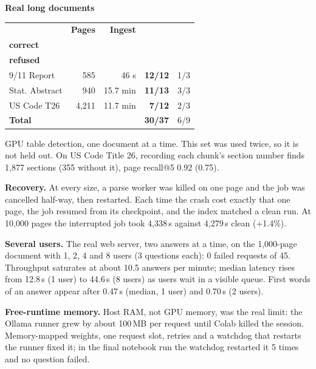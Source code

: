 \documentclass[10pt,a4paper]{article}
\newcommand{\note}[1]{{\raggedright\color{muted}\fontsize{8.3}{10}\selectfont #1\par}}
\begin{document}
\vspace{2pt}
\begin{minipage}[t]{0.52\textwidth}
\textbf{Real long documents} \par\vspace{2pt}
\renewcommand{\arraystretch}{1.18}
{\fontsize{8.2}{10}\selectfont
\begin{tabularx}{\linewidth}{@{}X r r r r@{}}
\toprule
 & \textbf{Pages} & \textbf{Ingest} & \shortstack[r]{\textbf{Answerable}\\\textbf{correct}} & \shortstack[r]{\textbf{Unanswerable}\\\textbf{refused}} \\ \midrule
9/11 Report & 585 & 46 s & \textbf{12/12} & 1/3 \\
Stat. Abstract & 940 & 15.7 min & \textbf{11/13} & 3/3 \\
US Code T26 & 4,211 & 11.7 min & \textbf{7/12} & 2/3 \\
\midrule
\textbf{Total} & & & \textbf{30/37} & 6/9 \\
\bottomrule
\end{tabularx}}
\note{GPU table detection, one document at a time. This set was used twice, so it is not held out. On US Code Title 26, recording each chunk's section number finds 1,877 sections (355 without it), page recall@5 0.92 (0.75).}
\end{minipage}\hfill
\begin{minipage}[t]{0.44\textwidth}
\fontsize{8.7}{10.6}\selectfont
\textbf{Recovery.} \enspace At every size, a parse worker was killed on one page and the job was cancelled half-way, then restarted.
Each time the crash cost exactly that one page, the job resumed from its checkpoint, and the index matched a clean run. At 10,000 pages the interrupted job took
4,338\,s against 4,279\,s clean (+1.4\%).\par\vspace{3pt}
\textbf{Several users.} \enspace The real web server, two answers at a time, on the 1,000-page document with 1, 2, 4 and 8 users (3 questions each): 0 failed requests of 45.
Throughput saturates at about 10.5 answers per minute; median latency rises from 12.8\,s (1 user) to 44.6\,s (8 users) as users wait in a visible queue.
First words of an answer appear after 0.47\,s (median, 1 user) and 0.70\,s (2 users).\par\vspace{3pt}
\textbf{Free-runtime memory.} \enspace Host RAM, not GPU memory, was the real limit: the Ollama runner grew by about 100\,MB per request until Colab killed the session.
Memory-mapped weights, one request slot, retries and a watchdog that restarts the runner fixed it; in the final notebook run the watchdog restarted it 5 times and no question failed.
\end{minipage}
\end{document}
